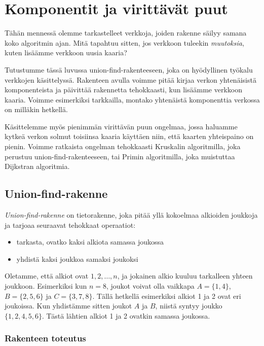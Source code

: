 \chapter{Komponentit ja virittävät puut}

Tähän mennessä olemme tarkastelleet verkkoja,
joiden rakenne säilyy samana koko algoritmin ajan.
Mitä tapahtuu sitten, jos verkkoon tuleekin \emph{muutoksia},
kuten lisäämme verkkoon uusia kaaria?

Tutustumme tässä luvussa union-find-rakenteeseen,
joka on hyödyl\-linen työkalu verkkojen käsittelyssä.
Rakenteen avulla voimme pitää kirjaa verkon yhtenäisistä
komponenteista ja päivittää rakennetta tehokkaasti,
kun lisäämme verkkoon kaaria.
Voimme esimerkiksi tarkkailla, montako yhte\-näistä
komponenttia verkossa on milläkin hetkellä.

Käsittelemme myös pienimmän virittävän puun ongelmaa,
jossa haluamme kytkeä verkon solmut toisiinsa kaaria käyttäen niin,
että kaarten yhteispaino on pienin.
Voimme ratkaista ongelman tehokkaasti Kruskalin algoritmilla,
joka perustuu union-find-rakenteeseen,
tai Primin algoritmilla, joka muistuttaa Dijkstran algoritmia.

\section{Union-find-rakenne}


\emph{Union-find-rakenne} on tietorakenne, joka
pitää yllä kokoelmaa alkioiden joukkoja ja tarjoaa
seuraavat tehokkaat operaatiot:

\begin{itemize}
\item tarkasta, ovatko kaksi alkiota samassa joukossa
\item yhdistä kaksi joukkoa samaksi joukoksi
\end{itemize}

Oletamme, että alkiot ovat $1,2,\dots,n$,
ja jokainen alkio kuuluu tarkalleen yhteen joukkoon.
Esimerkiksi kun $n=8$, joukot voivat olla vaikkapa
$A=\{1,4\}$, $B=\{2,5,6\}$ ja $C=\{3,7,8\}$.
Tällä hetkellä esimerkiksi alkiot 1 ja 2 ovat eri joukoissa.
Kun yhdistämme sitten joukot $A$ ja $B$,
niistä syntyy joukko $\{1,2,4,5,6\}$.
Tästä lähtien alkiot 1 ja 2 ovatkin samassa joukossa.

\subsection{Rakenteen toteutus}

